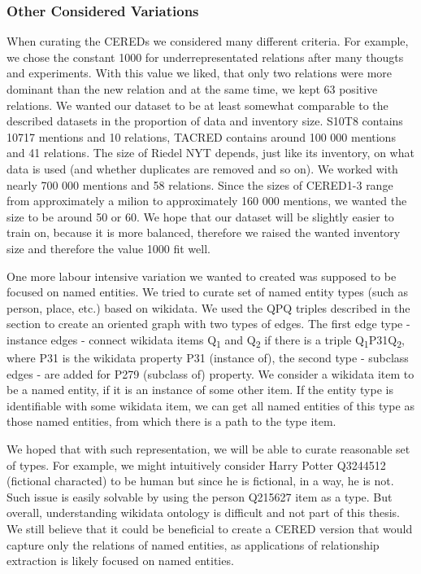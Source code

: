 \subsubsection{Other Considered Variations}
When curating the CEREDs we considered many different criteria. For example, we chose the constant 1000 for underrepresentated relations after many thougts and experiments. With this value we liked, that only two relations were more dominant than the new  relation and at the same time, we kept 63 positive relations. We wanted our dataset to be at least somewhat comparable to the described datasets in the proportion of data and inventory size. S10T8 contains 10717 mentions and 10 relations, TACRED contains around 100 000 mentions and 41 relations. The size of Riedel NYT depends, just like its inventory, on what data is used (and whether duplicates are removed and so on). We worked with nearly 700 000 mentions and 58 relations. Since the sizes of CERED1-3 range from approximately a milion to approximately 160 000 mentions, we wanted the size to be around 50 or 60. We hope that our dataset will be slightly easier to train on, because it is more balanced, therefore we raised the wanted inventory size and therefore the value 1000 fit well.

One more labour intensive variation we wanted to created was supposed to be focused on named entities. We tried to curate set of named entity types (such as person, place, etc.) based on wikidata. We used the QPQ triples described in the  section to create an oriented graph with two types of edges. The first edge type - instance edges - connect wikidata items Q\textsubscript{1} and Q\textsubscript{2} if there is a triple Q\textsubscript{1}P31Q\textsubscript{2}, where P31 is the wikidata property P31 (instance of), the second type - subclass edges - are added for P279 (subclass of) property. We consider a wikidata item to be a named entity, if it is an instance of some other item. If the entity type is identifiable with some wikidata item, we can get all named entities of this type as those named entities, from which there is a path to the type item.

We hoped that with such representation, we will be able to curate reasonable set of types. For example, we might intuitively consider Harry Potter Q3244512 (fictional characted) to be human but since he is fictional, in a way, he is not. Such issue is easily solvable by using the person Q215627 item as a type. But overall, understanding wikidata ontology is difficult and not part of this thesis. We still believe that it could be beneficial to create a CERED version that would capture only the relations of named entities, as applications of relationship extraction is likely focused on named entities.




